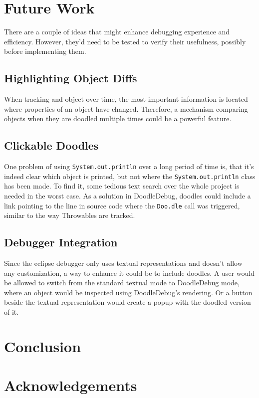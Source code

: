\documentclass[english]{scrartcl}
\newcommand{\DD}{Dood\-le\-De\-bug\xspace}
\newcommand{\Doodle}{\texttt{Doo.\-dle}\xspace}
\newcommand{\println}{\texttt{Sys\-tem.\-out.\-println}\xspace}
\begin{document}
\section{Future Work}
There are a couple of ideas that might enhance debugging experience and efficiency.
However, they'd need to be tested to verify their usefulness, possibly before implementing them.

\subsection{Highlighting Object Diffs}
When tracking and object over time, the most important information is located where properties of an object have changed.
Therefore, a mechanism comparing objects when they are doodled multiple times could be a powerful feature.

\subsection{Clickable Doodles}
One problem of using \println over a long period of time is, that it's indeed clear which object is printed, but not where the \println class has been made.
To find it, some tedious text search over the whole project is needed in the worst case.
As a solution in \DD, doodles could include a link pointing to the line in source code where the \Doodle call was triggered, similar to the way Throwables are tracked.

\subsection{Debugger Integration}
Since the eclipse debugger only uses textual representations and doesn't allow any customization, a way to enhance it could be to include doodles.
A user would be allowed to switch from the standard textual mode to \DD mode, where an object would be inspected using \DD's rendering.
Or a button beside the textual representation would create a popup with the doodled version of it.

\section{Conclusion}


\section{Acknowledgements}
\end{document}
